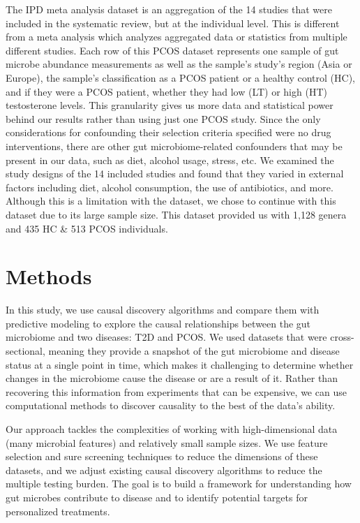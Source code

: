 \documentclass[12pt,letterpaper]{article}
\begin{document}
The IPD meta analysis dataset \citep{yang2024pcos} is an aggregation of the 14 studies that were included in the systematic review, but at the individual level. This is different from a meta analysis which analyzes aggregated data or statistics from multiple different studies. Each row of this PCOS dataset represents one sample of gut microbe abundance measurements as well as the sample’s study’s region (Asia or Europe), the sample’s classification as a PCOS patient or a healthy control (HC), and if they were a PCOS patient, whether they had low (LT) or high (HT) testosterone levels. This granularity gives us more data and statistical power behind our results rather than using just one PCOS study. Since the only considerations for confounding their selection criteria specified were no drug interventions, there are other gut microbiome-related confounders that may be present in our data, such as diet, alcohol usage, stress, etc. We examined the study designs of the 14 included studies and found that they varied in external factors including diet, alcohol consumption, the use of antibiotics, and more. Although this is a limitation with the dataset, we chose to continue with this dataset due to its large sample size. This dataset provided us with 1,128 genera and 435 HC \& 513 PCOS individuals. 

\section{Methods}

In this study, we use causal discovery algorithms and compare them with predictive modeling to explore the causal relationships between the gut microbiome and two diseases: T2D and PCOS. We used datasets that were cross-sectional, meaning they provide a snapshot of the gut microbiome and disease status at a single point in time, which makes it challenging to determine whether changes in the microbiome cause the disease or are a result of it. Rather than recovering this information from experiments that can be expensive, we can use computational methods to discover causality to the best of the data’s ability. 

Our approach tackles the complexities of working with high-dimensional data (many microbial features) and relatively small sample sizes. We use feature selection and sure screening techniques to reduce the dimensions of these datasets, and we adjust existing causal discovery algorithms to reduce the multiple testing burden. The goal is to build a framework for understanding how gut microbes contribute to disease and to identify potential targets for personalized treatments.  
\end{document}
